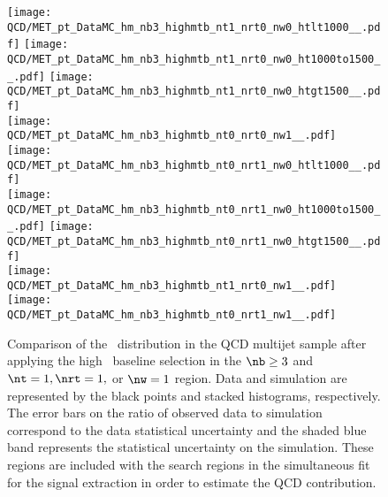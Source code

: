 \begin{figure}[!htb]
	\begin{center}
  \texttt{[image: QCD/MET\_pt\_DataMC\_hm\_nb3\_highmtb\_nt1\_nrt0\_nw0\_htlt1000\_\_.pdf]}
  \texttt{[image: QCD/MET\_pt\_DataMC\_hm\_nb3\_highmtb\_nt1\_nrt0\_nw0\_ht1000to1500\_\_.pdf]} 
  \texttt{[image: QCD/MET\_pt\_DataMC\_hm\_nb3\_highmtb\_nt1\_nrt0\_nw0\_htgt1500\_\_.pdf]} \\
  \texttt{[image: QCD/MET\_pt\_DataMC\_hm\_nb3\_highmtb\_nt0\_nrt0\_nw1\_\_.pdf]} 
  \texttt{[image: QCD/MET\_pt\_DataMC\_hm\_nb3\_highmtb\_nt0\_nrt1\_nw0\_htlt1000\_\_.pdf]} \\
  \texttt{[image: QCD/MET\_pt\_DataMC\_hm\_nb3\_highmtb\_nt0\_nrt1\_nw0\_ht1000to1500\_\_.pdf]}  
  \texttt{[image: QCD/MET\_pt\_DataMC\_hm\_nb3\_highmtb\_nt0\_nrt1\_nw0\_htgt1500\_\_.pdf]} \\
  \texttt{[image: QCD/MET\_pt\_DataMC\_hm\_nb3\_highmtb\_nt1\_nrt0\_nw1\_\_.pdf]} 
  \texttt{[image: QCD/MET\_pt\_DataMC\_hm\_nb3\_highmtb\_nt0\_nrt1\_nw1\_\_.pdf]} \\
	\end{center}
	\caption[QCD Multijet HM Control Region $\nb\geq3$ with 1 heavy object]{Comparison of the \met~distribution in the QCD multijet sample after applying the high \dm~baseline selection in the $\nb\geq3$ and $\nt=1, \nrt=1,$ or $\nw=1$ region. Data and simulation are represented by the black points and stacked histograms, respectively. The error bars on the ratio of observed data to simulation correspond to the data statistical uncertainty and the shaded blue band represents the statistical uncertainty on the simulation. These regions are included with the search regions in the simultaneous fit for the signal extraction in order to estimate the QCD contribution.
	 }
	\label{fig:qcd-cr-datavsmc-hm-nb3-1}
\end{figure}

